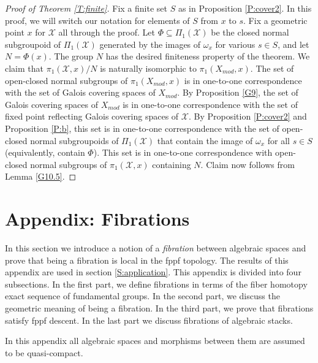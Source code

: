 \documentclass{amsart}
\theoremstyle{definition}
\theoremstyle{remark}
\theoremstyle{remark}
\newcommand{\X}{\mathcal{X}}
\newcommand{\Xm}{X_{mod}}
\newcommand{\ox}{\omega_x}
\newcommand{\PX}{\Pi_1(\X)}
\newcommand{\pX}{\pi_1(\X,x)}
\newcommand{\pXm}{\pi_1(\Xm,x)}
\begin{document}
\begin{proof}[Proof of Theorem \ref{T:finite}]
Fix a finite set $S$ as in Proposition \ref{P:cover2}. In this
proof, we will switch our notation for elements of $S$ from $x$ to
$s$. Fix a geometric point $x$ for $\X$ all through the proof. Let
$\Phi \subseteq \PX$ be the closed normal subgroupoid of $\PX$
generated by the images of $\ox$ for various $s \in S$, and let
$N=\Phi(x)$. The group $N$ has the desired finiteness property of
the theorem. We claim that $\pX/{N}$ is naturally isomorphic to
$\pXm$. The set of open-closed normal subgroups of $\pXm$ is in
one-to-one correspondence with the set of Galois covering spaces
of $\Xm$. By Proposition \ref{G9}, the set of Galois covering
spaces of $\Xm$ is in one-to-one correspondence with the set of
fixed point reflecting Galois covering spaces of $\X$. By
Proposition \ref{P:cover2} and  Proposition \ref{P:b}, this set is
in one-to-one correspondence with the set of open-closed normal
subgroupoids of $\PX$ that contain the image of $\ox$ for all $s
\in S$ (equivalently, contain $\Phi$). This set is in one-to-one
correspondence with open-closed normal subgroups of $\pX$
containing $N$. Claim now follows from Lemma \ref{G10.5}.
\end{proof}

 \pagebreak


\setcounter{section}{1} \setcounter{equation}{1}
\renewcommand{\thesection}{\Alph{section}}

\section*{Appendix: Fibrations}


In this section we introduce a notion of a {\em fibration} between
algebraic spaces and prove that being a fibration is local in the
fppf topology. The results of this appendix are used in section
\ref{S:application}.  This appendix is divided into four
subsections. In the first part, we define fibrations in terms of
the fiber homotopy exact sequence of fundamental groups. In the
second part, we discuss the geometric meaning of being a
fibration. In the third  part, we prove that fibrations satisfy
fppf descent. In the last part we discuss
 fibrations  of algebraic stacks.

In this appendix all algebraic spaces and morphisms between them
are assumed to be quasi-compact.
\end{document}
